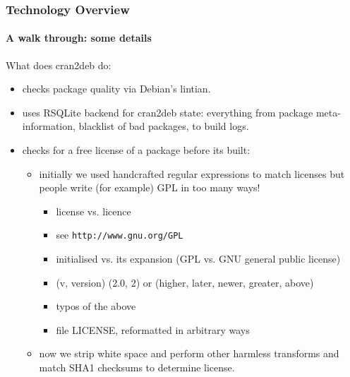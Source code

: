 \documentclass[smaller,compress]{beamer}
\begin{document}
\begin{frame}
  \frametitle{Technology Overview} 
  \framesubtitle{A walk through: some details}

  What does cran2deb do:
  \begin{itemize}
  \item checks package quality via Debian's lintian.
  \item uses RSQLite backend for cran2deb state: everything from package
    meta-information, blacklist of bad packages, to build logs. 
  \item checks for a free license of a package before its built:
    \begin{itemize}
        \item initially we used handcrafted regular expressions to match
                licenses but people write (for example) GPL in too many ways!
            \begin{itemize}
                \item license vs. licence
                \item see \texttt{http://www.gnu.org/GPL}
                \item initialised vs. its expansion (GPL vs. GNU general public license)
                \item (v, version) (2.0, 2) or (higher, later, newer, greater, above)
                \item typos of the above
                \item file LICENSE, reformatted in arbitrary ways
            \end{itemize}
        \item now we strip white space and perform other harmless transforms
              and match SHA1 checksums to determine license.
    \end{itemize}
  \end{itemize}
\end{frame}  
\end{document}
